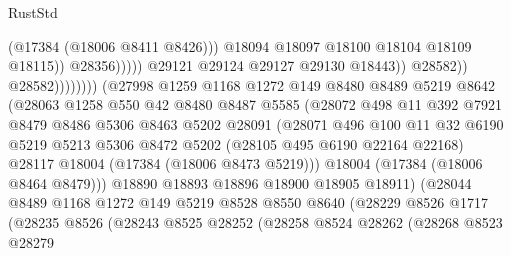 \begin{lexlean}{RustStd}
\begin{coremodule}
                                                    (@17384 (@18006 @8411 @8426)))
                                                  @18094
                                                  @18097
                                                  @18100
                                                  @18104
                                                  @18109
                                                  @18115))
                                              @28356)))))
                                    @29121
                                    @29124
                                    @29127
                                    @29130
                                    @18443))
                                @28582))
                            @28582))))))))
            (@27998
              @1259
              @1168
              @1272
              @149
              @8480
              @8489
              @5219
              @8642
              (@28063
                @1258
                @550
                @42
                @8480
                @8487
                @5585
                (@28072
                  @498
                  @11
                  @392
                  @7921
                  @8479
                  @8486
                  @5306
                  @8463
                  @5202
                  @28091
                  (@28071
                    @496
                    @100
                    @11
                    @32
                    @6190
                    @5219
                    @5213
                    @5306
                    @8472
                    @5202
                    (@28105 @495 @6190 @22164 @22168)
                    @28117
                    @18004
                    (@17384 (@18006 @8473 @5219)))
                  @18004
                  (@17384 (@18006 @8464 @8479)))
                @18890
                @18893
                @18896
                @18900
                @18905
                @18911)
              (@28044
                @8489
                @1168
                @1272
                @149
                @5219
                @8528
                @8550
                @8640
                (@28229
                  @8526
                  @1717
                  (@28235
                    @8526
                    (@28243
                      @8525
                      @28252
                      (@28258
                        @8524
                        @28262
                        (@28268
                          @8523
                          @28279

\end{coremodule}
\end{lexlean}
